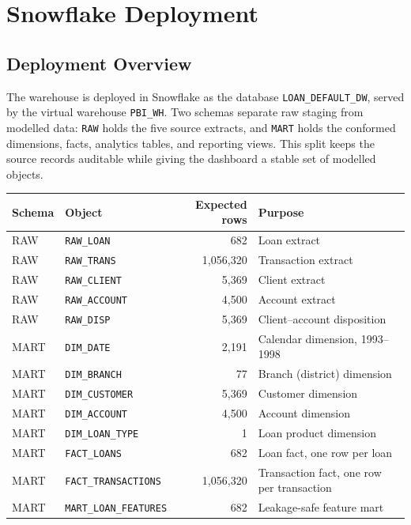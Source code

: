 \chapter{Snowflake Deployment}
\section{Deployment Overview}
The warehouse is deployed in Snowflake as the database \texttt{LOAN\_DEFAULT\_DW}, served by the virtual warehouse \texttt{PBI\_WH}. Two schemas separate raw staging from modelled data: \texttt{RAW} holds the five source extracts, and \texttt{MART} holds the conformed dimensions, facts, analytics tables, and reporting views. This split keeps the source records auditable while giving the dashboard a stable set of modelled objects.

\begin{table}[H]
    \centering
    \small
    \renewcommand{\arraystretch}{1.15}
    \begin{tabularx}{\textwidth}{|l|l|r|X|}
        \hline
        \textbf{Schema} & \textbf{Object} & \textbf{Expected rows} & \textbf{Purpose} \\
        \hline
        RAW & \texttt{RAW\_LOAN} & 682 & Loan extract \\
        RAW & \texttt{RAW\_TRANS} & 1,056,320 & Transaction extract \\
        RAW & \texttt{RAW\_CLIENT} & 5,369 & Client extract \\
        RAW & \texttt{RAW\_ACCOUNT} & 4,500 & Account extract \\
        RAW & \texttt{RAW\_DISP} & 5,369 & Client--account disposition \\
        MART & \texttt{DIM\_DATE} & 2,191 & Calendar dimension, 1993--1998 \\
        MART & \texttt{DIM\_BRANCH} & 77 & Branch (district) dimension \\
        MART & \texttt{DIM\_CUSTOMER} & 5,369 & Customer dimension \\
        MART & \texttt{DIM\_ACCOUNT} & 4,500 & Account dimension \\
        MART & \texttt{DIM\_LOAN\_TYPE} & 1 & Loan product dimension \\
        MART & \texttt{FACT\_LOANS} & 682 & Loan fact, one row per loan \\
        MART & \texttt{FACT\_TRANSACTIONS} & 1,056,320 & Transaction fact, one row per transaction \\
        MART & \texttt{MART\_LOAN\_FEATURES} & 682 & Leakage-safe feature mart \\

\end{tabularx}
\end{table}
